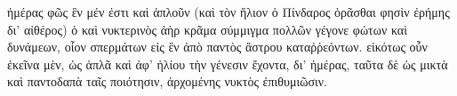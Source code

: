 \documentclass[a4paper, 11pt, oneside, polutonikogreek, german]{article}
\begin{document}
ἡμέρας φῶς ἓν μέν ἐστι καὶ ἁπλοῦν (καὶ τὸν ἥλιον ὁ Πίνδαρος ὁρᾶσθαι φησὶν ἐρήμης δι' αἰθέρος) ὁ καὶ νυκτερινὸς ἀὴρ κρᾶμα σύμμιγμα πολλῶν γέγονε φώτων καὶ δυνάμεων, οἷον σπερμάτων εἰς ἓν ἀπὸ παντὸς ἄστρου καταῤῥεόντων. εἰκότως οὖν ἐκεῖνα μὲν, ὡς ἁπλᾶ καὶ ἀφ' ἡλίου τὴν γένεσιν ἔχοντα, δι' ἡμέρας, ταῦτα δὲ ὡς μικτὰ καὶ παντοδαπὰ ταῖς ποιότησιν, ἀρχομένης νυκτὸς ἐπιθυμιῶσιν.

\clearpage
\end{document}
